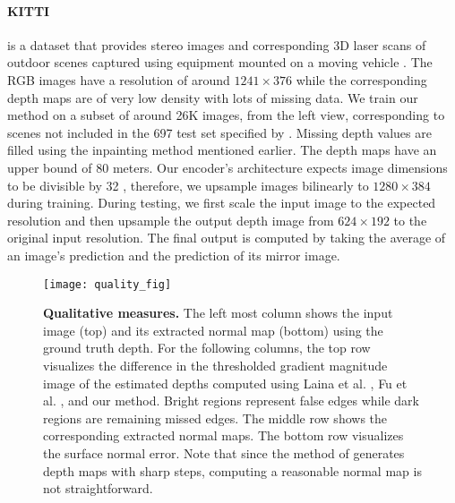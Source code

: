 \documentclass[10pt,twocolumn,letterpaper]{article}
\begin{document}
\paragraph{KITTI} is a dataset that provides stereo images and corresponding 3D laser scans of outdoor scenes captured using equipment mounted on a moving vehicle \cite{geiger2013vision}. The RGB images have a resolution of around $1241\times376$ while the corresponding depth maps are of very low density with lots of missing data. We train our method on a subset of around 26K images, from the left view, corresponding to scenes not included in the 697 test set specified by \cite{Eigen2014}. Missing depth values are filled using the inpainting method mentioned earlier. The depth maps have an upper bound of 80 meters. Our encoder's architecture expects image dimensions to be divisible by 32 \cite{huang2017densely}, therefore, we upsample images bilinearly to $1280\times384$ during training. During testing, we first scale the input image to the expected resolution and then upsample the output depth image from $624\times192$ to the original input resolution. The final output is computed by taking the average of an image's prediction and the prediction of its mirror image.

\begin{figure*}[t]
\begin{center}
\texttt{[image: quality\_fig]}
\end{center}
   \caption{\textbf{Qualitative measures.} The left most column shows the input image (top) and its extracted normal map (bottom) using the ground truth depth. For the following columns, the top row visualizes the difference in the thresholded gradient magnitude image of the estimated depths computed using Laina et al. \cite{Laina2016}, Fu et al. \cite{Fu2018DeepOR}, and our method. Bright regions represent false edges while dark regions are remaining missed edges. The middle row shows the corresponding extracted normal maps. The bottom row visualizes the surface normal error. Note that since the method of \cite{Fu2018DeepOR} generates depth maps with sharp steps, computing a reasonable normal map is not straightforward. }
\label{fig:qualitative}
\end{figure*}
\end{document}
